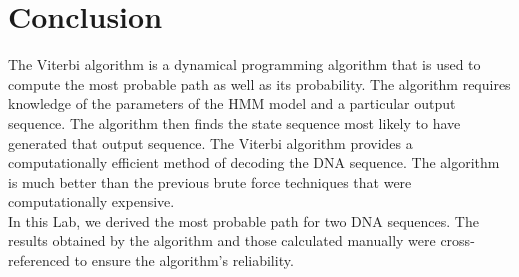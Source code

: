 \documentclass{article}
\begin{document}
\section{Conclusion}\label{sec:conc}
The Viterbi algorithm is a dynamical programming algorithm that is used to compute the most probable path as well as its probability. The algorithm requires knowledge of the parameters of the HMM model and a particular output sequence. The algorithm then finds the state sequence most likely to have generated that output sequence. The Viterbi algorithm provides a computationally efficient method of decoding the DNA sequence. The algorithm is much better than the previous brute force techniques that were computationally expensive.\\

In this Lab, we derived the most probable path for two DNA sequences. The results obtained by the algorithm and those calculated manually were cross-referenced to ensure the algorithm's reliability.
\end{document}
